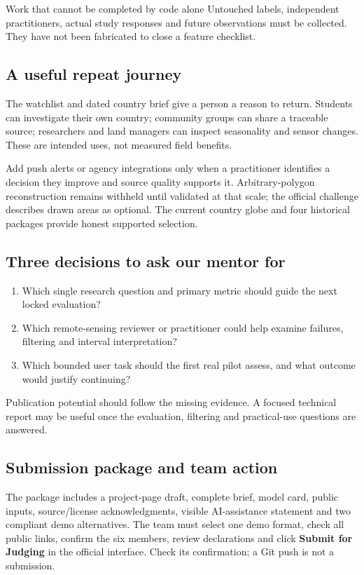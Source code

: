 \begin{keypoint}{Work that cannot be completed by code alone}
Untouched labels, independent practitioners, actual study responses and future observations must be collected. They have not been fabricated to close a feature checklist.
\end{keypoint}

\subsection{A useful repeat journey}
The watchlist and dated country brief give a person a reason to return. Students can investigate their own country; community groups can share a traceable source; researchers and land managers can inspect seasonality and sensor changes. These are intended uses, not measured field benefits.

Add push alerts or agency integrations only when a practitioner identifies a decision they improve and source quality supports it. Arbitrary-polygon reconstruction remains withheld until validated at that scale; the official challenge describes drawn areas as optional. The current country globe and four historical packages provide honest supported selection.

\subsection{Three decisions to ask our mentor for}
\begin{enumerate}
\item Which single research question and primary metric should guide the next locked evaluation?
\item Which remote-sensing reviewer or practitioner could help examine failures, filtering and interval interpretation?
\item Which bounded user task should the first real pilot assess, and what outcome would justify continuing?
\end{enumerate}
Publication potential should follow the missing evidence. A focused technical report may be useful once the evaluation, filtering and practical-use questions are answered.

\subsection{Submission package and team action}
The package includes a project-page draft, complete brief, model card, public inputs, source/license acknowledgments, visible AI-assistance statement and two compliant demo alternatives. The team must select one demo format, check all public links, confirm the six members, review declarations and click \textbf{Submit for Judging} in the official interface. Check its confirmation; a Git push is not a submission.

